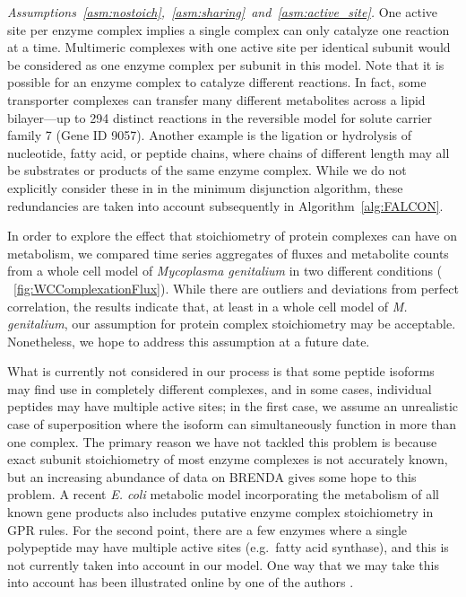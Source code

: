 \emph{Assumptions~\ref{asm:nostoich},~\ref{asm:sharing}~and~\ref{asm:active_site}.}
One active site per enzyme complex implies a single complex can only
catalyze one reaction at a time. Multimeric complexes with one active
site per identical subunit would be considered as one enzyme complex
per subunit in this model. Note that it is possible for an enzyme
complex to catalyze different reactions. In fact, some transporter
complexes can transfer many different metabolites across a lipid
bilayer---up to 294 distinct reactions in the reversible model for
solute carrier family 7 (Gene ID 9057).  Another example is the
ligation or hydrolysis of nucleotide, fatty acid, or peptide chains,
where chains of different length may all be substrates or products of
the same enzyme complex. While we do not explicitly consider these in
in the minimum disjunction algorithm, these redundancies are taken into
account subsequently in Algorithm~\ref{alg:FALCON}.

In order to explore the effect that stoichiometry of protein complexes
can have on metabolism, we compared time series aggregates of fluxes
and metabolite counts from a whole cell model of \emph{Mycoplasma
genitalium} \citep{Karr2012} in two different conditions (\suppOrApp
\Fig~\ref{fig:WCComplexationFlux}). While there are outliers and
deviations from perfect correlation, the results indicate that, 
at least in a whole cell model of \emph{M. genitalium}, our
assumption for protein complex stoichiometry may be acceptable.
Nonetheless, we hope to address this assumption at a future date.

What is currently not considered in our process is that some peptide
isoforms may find use in completely different complexes, and in some
cases, individual peptides may have multiple active sites; in the
first case, we assume an unrealistic case of superposition where the
isoform can simultaneously function in more than one complex. The
primary reason we have not tackled this problem is because exact
subunit stoichiometry of most enzyme complexes is not accurately
known, but an increasing abundance of data on BRENDA
\citep{Schomburg2013} gives some hope to this problem. A recent
\textit{E. coli} metabolic model incorporating the metabolism of all
known gene products \citep{O'Brien2013} also includes putative
enzyme complex stoichiometry in GPR rules. For the second point, there
are a few enzymes where a single polypeptide may have multiple active
sites (e.g.\ fatty acid synthase), and this is not currently taken into
account in our model. One way that we may take this into account has
been illustrated online by one of the authors \citep{Smallbone2014}. 

